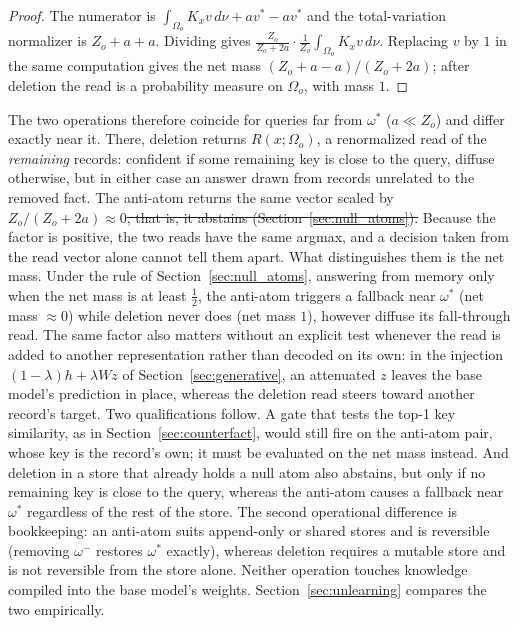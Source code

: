 \documentclass[preprint,12pt]{elsarticle}
\makeatletter
\newcommand{\Om}{\Omega}
\newif\ifmarkchanges
\newcommand{\revii}[1]{\ifmarkchanges{\color{blue}#1}\else#1\fi} %
\providecommand{\DIFaddtex}[1]{{\protect\color{blue}\uwave{#1}}} %
\providecommand{\DIFdeltex}[1]{{\protect\color{red}\sout{#1}}} %
\providecommand{\DIFaddbegin}{} %
\providecommand{\DIFaddend}{} %
\providecommand{\DIFdelbegin}{} %
\providecommand{\DIFdelend}{} %
\providecommand{\DIFadd}[1]{\texorpdfstring{\DIFaddtex{#1}}{#1}} %
\providecommand{\DIFdel}[1]{\texorpdfstring{\DIFdeltex{#1}}{}} %
\providecommand{\DIFscaledelfig}{0.5}
\newlength{\DIFdelgraphicswidth} %
\newlength{\DIFdelgraphicsheight} %
\providecommand{\DIFaddincludegraphics}[2][]{{\color{blue}\fbox{\DIFOincludegraphics[#1]{#2}}}} %
\providecommand{\DIFdelincludegraphics}[2][]{%
\sbox{\DIFdelgraphicsbox}{\DIFOincludegraphics[#1]{#2}}%
\settoboxwidth{\DIFdelgraphicswidth}{\DIFdelgraphicsbox} %
\settoboxtotalheight{\DIFdelgraphicsheight}{\DIFdelgraphicsbox} %
\scalebox{\DIFscaledelfig}{%
\parbox[b]{\DIFdelgraphicswidth}{\usebox{\DIFdelgraphicsbox}\\[-\baselineskip] \rule{\DIFdelgraphicswidth}{0em}}\llap{\resizebox{\DIFdelgraphicswidth}{\DIFdelgraphicsheight}{%
\setlength{\unitlength}{\DIFdelgraphicswidth}%
\begin{picture}(1,1)%
\thicklines\linethickness{2pt} %
{\color[rgb]{1,0,0}\put(0,0){\framebox(1,1){}}}%
{\color[rgb]{1,0,0}\put(0,0){\line( 1,1){1}}}%
{\color[rgb]{1,0,0}\put(0,1){\line(1,-1){1}}}%
\end{picture}%
}\hspace*{3pt}}} %
} %
\DeclareRobustCommand{\DIFaddbegin}{\DIFOaddbegin \let\includegraphics\DIFaddincludegraphics} %
\DeclareRobustCommand{\DIFaddend}{\DIFOaddend \let\includegraphics\DIFOincludegraphics} %
\DeclareRobustCommand{\DIFdelbegin}{\DIFOdelbegin \let\includegraphics\DIFdelincludegraphics} %
\DeclareRobustCommand{\DIFdelend}{\DIFOaddend \let\includegraphics\DIFOincludegraphics} %
\let\sout@orig\sout %
\renewcommand{\sout}[1]{\ifmmode\text{\sout@orig{\ensuremath{#1}}}\else\sout@orig{#1}\fi} %
\makeatother
\begin{document}
\begin{proof}
The numerator is $\int_{\Om_o}K_x v\,d\nu+a v^*-a v^*$ and the total-variation normalizer is $Z_o+a+a$. Dividing gives $\frac{Z_o}{Z_o+2a}\cdot\frac{1}{Z_o}\int_{\Om_o}K_x v\,d\nu$. \DIFaddbegin \revii{Replacing $v$ by $1$ in the same computation gives the net mass $(Z_o+a-a)/(Z_o+2a)$; after deletion the read is a probability measure on $\Om_o$, with mass $1$.} \DIFaddend \qedhere
\end{proof}

The two operations therefore coincide for queries far from $\omega^*$ ($a\ll Z_o$) and differ exactly near it. There, deletion returns $R(x;\Om_o)$, a renormalized read of the \emph{remaining} records: confident if some remaining key is close to the query, diffuse otherwise, but in either case an answer drawn from records unrelated to the removed fact. The anti-atom returns the same vector scaled by $Z_o/(Z_o+2a)\approx0$\DIFdelbegin \DIFdel{, that is, it abstains (Section~\ref{sec:null_atoms}). }\DIFdelend \DIFaddbegin \DIFadd{. }\revii{Because the factor is positive, the two reads have the same argmax, and a decision taken from the read vector alone cannot tell them apart. What distinguishes them is the net mass. Under the rule of Section~\ref{sec:null_atoms}, answering from memory only when the net mass is at least $\tfrac12$, the anti-atom triggers a fallback near $\omega^*$ (net mass $\approx0$) while deletion never does (net mass $1$), however diffuse its fall-through read. The same factor also matters without an explicit test whenever the read is added to another representation rather than decoded on its own: in the injection $(1-\lambda)h+\lambda W z$ of Section~\ref{sec:generative}, an attenuated $z$ leaves the base model's prediction in place, whereas the deletion read steers toward another record's target. Two qualifications follow. A gate that tests the top-1 key similarity, as in Section~\ref{sec:counterfact}, would still fire on the anti-atom pair, whose key is the record's own; it must be evaluated on the net mass instead. And deletion in a store that already holds a null atom also abstains, but only if no remaining key is close to the query, whereas the anti-atom causes a fallback near $\omega^*$ regardless of the rest of the store.} \DIFaddend The second operational difference is bookkeeping: an anti-atom suits append-only or shared stores and is reversible (removing $\omega^-$ restores $\omega^*$ exactly), whereas deletion requires a mutable store and is not reversible from the store alone. Neither operation touches knowledge compiled into the base model's weights. Section~\ref{sec:unlearning} compares the two empirically.
\end{document}
